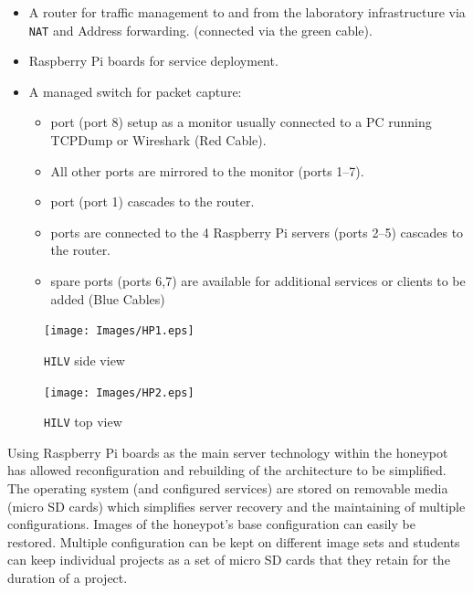 \begin{itemize}
    \item \noindent A router for traffic management to and from the laboratory
      infrastructure via \texttt{NAT} and Address forwarding. (connected via the
      green cable).  \item {} Raspberry Pi boards for service deployment.
    \item \noindent A managed switch for packet capture:
    \begin{itemize}
        \item {} port (port 8) setup as a monitor usually connected to
          a PC running TCPDump or Wireshark (Red Cable).
        \item \noindent All other ports are mirrored to the monitor (ports
          1--7).
        \item {} port (port 1) cascades to the router.
        \item {} ports are connected to the 4 Raspberry Pi servers
          (ports 2--5) cascades to the router.
        \item {} spare ports (ports 6,7) are available for additional
          services or clients to be added (Blue Cables)
    \end{itemize}
\end{itemize}

\begin{figure}[ht]
  \centering
  \begin{minipage}[h]{0.45\textwidth}
    \texttt{[image: Images/HP1.eps]}
    \caption{\texttt{HILV} side view\label{fig:HP1}}
  \end{minipage}
  \hfill
  \begin{minipage}[h]{0.45\textwidth}
    \texttt{[image: Images/HP2.eps]}
    \caption{\texttt{HILV} top view\label{fig:HP2}}
  \end{minipage}
\end{figure}


Using Raspberry Pi boards as the main server technology within the honeypot has
allowed reconfiguration and rebuilding of the architecture to be simplified.
The operating system (and configured services) are stored on removable media
(micro SD cards) which simplifies server recovery and the maintaining of
multiple configurations. Images of the honeypot's base configuration can easily
be restored. Multiple configuration can be kept on different image sets and
students can keep individual projects as a set of micro SD cards that they
retain for the duration of a project.


